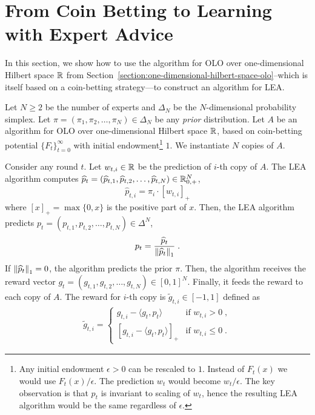 \section{From Coin Betting to Learning with Expert Advice}
\label{section:reduction-experts}

In this section, we show how to use the algorithm for OLO over one-dimensional
Hilbert space $\mathbb{R}$ from
Section~\ref{section:one-dimensional-hilbert-space-olo}--which is itself based
on a coin-betting strategy---to construct an algorithm for \ac{LEA}.

Let $N \ge 2$ be the number of experts and $\Delta_N$ be the $N$-dimensional
probability simplex. Let $\pi = (\pi_1, \pi_2, \dots, \pi_N) \in \Delta_N$ be
any \emph{prior} distribution. Let $A$ be an algorithm for OLO over
one-dimensional Hilbert space $\mathbb{R}$, based on coin-betting potential 
$\{F_t\}_{t=0}^\infty$ with initial endowment\footnote{Any initial endowment $\epsilon > 0$ can be
rescaled to $1$. Instead of $F_t(x)$ we would use $F_t(x)/\epsilon$. The
prediction $w_t$ would become $w_t/\epsilon$. The key observation is that $p_t$
is invariant to scaling of $w_t$, hence the resulting LEA algorithm would be
the same regardless of $\epsilon$.} $1$. We instantiate $N$ copies of $A$.

Consider any round $t$. Let $w_{t,i} \in \mathbb{R}$ be the prediction of $i$-th copy of
$A$. The LEA algorithm computes $\widehat p_t = (\widehat p_{t,1}, \widehat
p_{t,2}, \dots, \widehat p_{t,N}) \in \mathbb{R}_{0,+}^N$,
\begin{equation}
\label{eq:phat}
\widehat p_{t,i} = \pi_i \cdot [w_{t,i}]_+
\end{equation}
where $[x]_+ = \max\{0,x\}$ is the positive part of $x$. Then, the LEA
algorithm predicts $p_t = (p_{t,1}, p_{t,2}, \dots, p_{t,N}) \in \Delta^N$,
\begin{equation}
\label{eq:preds_experts}
p_t = \frac{\widehat p_t}{\left\|{\widehat p_t}\right\|_1} \; .
\end{equation}
If $\left\|{\widehat p_t}\right\|_1 = 0$, the algorithm predicts the prior $\pi$.
Then, the algorithm receives the reward vector
$g_t = (g_{t,1}, g_{t,2}, \dots, g_{t,N}) \in [0,1]^N$. Finally, it
feeds the reward to each copy of $A$. The reward for $i$-th copy is $\widetilde g_{t,i} \in
[-1,1]$ defined as
\begin{align}
\label{eq:gradients_experts_reduction}
\widetilde g_{t,i} =
\begin{cases}
g_{t,i} - \langle g_t, p_t \rangle & \text{if } w_{t,i} > 0 \; , \\
\left[g_{t,i} - \langle g_t, p_t \rangle \right]_+ & \text{if } w_{t,i} \le 0 \; .
\end{cases}
\end{align}

